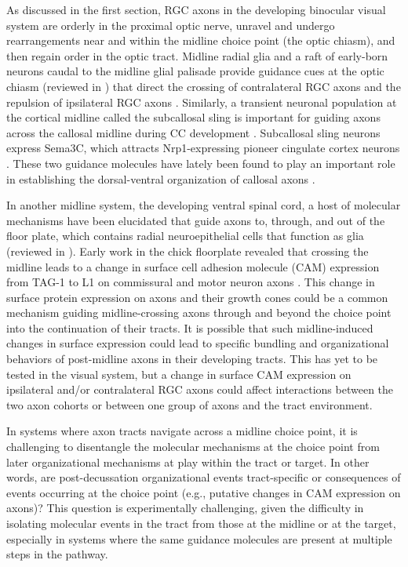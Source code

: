 As discussed in the first section, RGC axons in the developing binocular visual system are orderly in the proximal optic nerve, unravel and undergo rearrangements near and within the midline choice point (the optic chiasm), and then regain order in the optic tract. 
Midline radial glia and a raft of early-born neurons caudal to the midline glial palisade provide guidance cues at the optic chiasm (reviewed in \cite{erskine2014connecting,petros2008retinal}) that direct the crossing of contralateral RGC axons \cite{charron2003morphogen,erskine2011vegf,kuwajima2012optic,williams2006role} and the repulsion of ipsilateral RGC axons \cite{williams2003ephrin,petros2010ephrin,petros2009specificity,}. 
Similarly, a transient neuronal population at the cortical midline called the subcallosal sling is important for guiding axons across the callosal midline during CC development \cite{suarez2014evolution}. 
Subcallosal sling neurons express Sema3C, which attracts Nrp1-expressing pioneer cingulate cortex neurons \cite{niquille2009transient,piper2009neuropilin}. 
These two guidance molecules have lately been found to play an important role in establishing the dorsal-ventral organization of callosal axons \cite{zhou2013axon}. 

In another midline system, the developing ventral spinal cord, a host of molecular mechanisms have been elucidated that guide axons to, through, and out of the floor plate, which contains radial neuroepithelial cells that function as glia (reviewed in \cite{neuhaus2015crossing}). 
Early work in the chick floorplate revealed that crossing the midline leads to a change in surface cell adhesion molecule (CAM) expression from TAG-1 to L1 on commissural and motor neuron axons \cite{dodd1988spatial}. 
This change in surface protein expression on axons and their growth cones could be a common mechanism guiding midline-crossing axons through and beyond the choice point into the continuation of their tracts. 
It is possible that such midline-induced changes in surface expression could lead to specific bundling and organizational behaviors of post-midline axons in their developing tracts. 
This has yet to be tested in the visual system, but a change in surface CAM expression on ipsilateral and/or contralateral RGC axons could affect interactions between the two axon cohorts or between one group of axons and the tract environment. 

In systems where axon tracts navigate across a midline choice point, it is challenging to disentangle the molecular mechanisms at the choice point from later organizational mechanisms at play within the tract or target. 
In other words, are post-decussation organizational events tract-specific or consequences of events occurring at the choice point (e.g., putative changes in CAM expression on axons)? 
This question is experimentally challenging, given the difficulty in isolating molecular events in the tract from those at the midline or at the target, especially in systems where the same guidance molecules are present at multiple steps in the pathway. 

